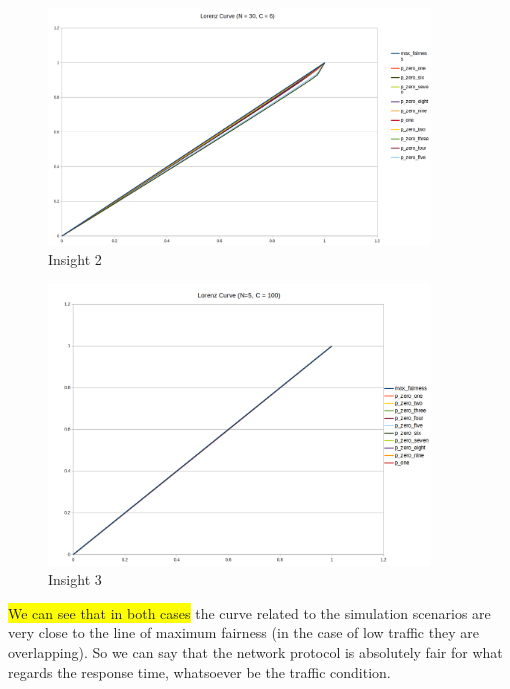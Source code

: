 \begin{figure}[H]
	\centering
	\includegraphics[width=0.9\textwidth]{img/LorenzHighTraffic.png}
	\caption{Insight 2}
	\label{img: insight2_respTime}
\end{figure}
\begin{figure}[H]
	\centering
	\includegraphics[width=0.9\textwidth]{img/LorenzLowTraffic.png}
	\caption{Insight 3}
	\label{img: insight3_respTime}
\end{figure}

\noindent \colorbox{yellow}{We can see that in both cases} the curve related to the simulation scenarios are very close to the line of maximum fairness (in the case of low traffic they are overlapping). So we can say that the network protocol is absolutely fair for what regards the response time, whatsoever be the traffic condition.

